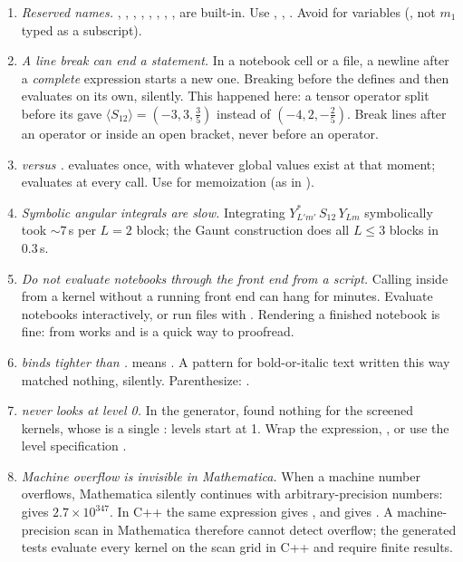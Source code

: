 \documentclass[11pt,a4paper]{article}
\numberwithin{equation}{section}
\theoremstyle{definition}
\theoremstyle{plain}
\theoremstyle{remark}
\numberwithin{algorithm}{section}
\begin{document}
\begin{enumerate}[leftmargin=1.5em,itemsep=3pt]
\item \emph{Reserved names.} , , , , , , , ,  are built-in. Use , , . Avoid  for variables (, not $m_1$ typed as a subscript).
\item \emph{A line break can end a statement.} In a notebook cell or a  file, a newline after a \emph{complete} expression starts a new one. Breaking  before the \code{+} defines  and then evaluates  on its own, silently. This happened here: a tensor operator split before its  gave $\langle S_{12}\rangle=(-3,3,\frac35)$ instead of $(-4,2,-\frac25)$. Break lines after an operator or inside an open bracket, never before an operator.
\item \emph{\code{=} versus \code{:=}.}  evaluates  once, with whatever global values exist at that moment; \code{:=} evaluates at every call. Use  for memoization (as in ).
\item \emph{Symbolic angular integrals are slow.} Integrating $Y^*_{L'm'}\,S_{12}\,Y_{Lm}$ symbolically took $\sim7\,$s per $L=2$ block; the Gaunt construction does all $L\le3$ blocks in $0.3\,$s.
\item \emph{Do not evaluate notebooks through the front end from a script.} Calling  inside  from a kernel without a running front end can hang for minutes. Evaluate notebooks interactively, or run  files with . Rendering a finished notebook is fine:  from  works and is a quick way to proofread.
\item \emph{\code{|} binds tighter than \code{->}.}  means . A pattern for bold-or-italic text written this way matched nothing, silently. Parenthesize: .
\item \emph{ never looks at level 0.} In the generator,  found nothing for the screened kernels, whose  is a single : levels start at 1. Wrap the expression, , or use the level specification .
\item \emph{Machine overflow is invisible in Mathematica.} When a machine number overflows, Mathematica silently continues with arbitrary-precision numbers:  gives $2.7\times10^{347}$. In C++ the same expression gives , and  gives . A machine-precision scan in Mathematica therefore cannot detect overflow; the generated tests evaluate every kernel on the scan grid in C++ and require finite results.

\end{enumerate}
\end{document}
